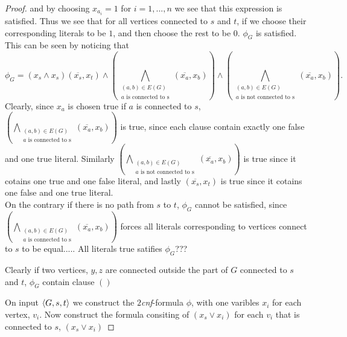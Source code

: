 \documentclass[a4paper,11pt]{article}
\numberwithin{equation}{section}
\begin{document}
\begin{proof}
		
		
		and by choosing $ x_{a_i}=1 $ for $ i=1,...,n $ we see that this expression is satisfied. Thus we see that for all vertices connected to $ s $ and $ t $, if we choose their corresponding literals to be $ 1 $, and then choose the rest to be $ 0 $. $ \phi_G $ is satisfied. This can be seen by noticing that \begin{equation*}
		\phi_G=(x_s\wedge x_s)(\overline{x_s},x_t)\wedge\left(\bigwedge_{\substack{(a,b)\in E(G)\\a \text{ is connected to s}}}(\overline{x_a},x_b)\right)\wedge\left(\bigwedge_{\substack{(a,b)\in E(G)\\a \text{ is not connected to s}}}(\overline{x_a},x_b)\right).
		\end{equation*}
		Clearly, since $ x_a $ is chosen true if $ a $ is connected to $ s $, $ \left(\bigwedge_{\substack{(a,b)\in E(G)\\a \text{ is connected to s}}}(\overline{x_a},x_b)\right) $ is true, since each clause contain exactly one false and one true literal. Similarly $ \left(\bigwedge_{\substack{(a,b)\in E(G)\\a \text{ is not connected to s}}}(\overline{x_a},x_b)\right) $ is true since it cotains one true and one false literal, and lastly $ (\overline{x_s},x_t) $ is true since it cotains one false and one true literal.\\
		On the contrary if there is no path from $ s $ to $ t $, $ \phi_G $ cannot be satisfied, since $ \left(\bigwedge_{\substack{(a,b)\in E(G)\\a \text{ is connected to s}}}(\overline{x_a},x_b)\right) $ forces all literals corresponding to vertices connect to $ s $ to be equal.....
		All literals true satifies $ \phi_G $???
		
		
		Clearly if two vertices, $ y,z $ are connected outside the part of $ G $ connected to $ s $ and $ t $, $ \phi_{G} $ contain clause $ () $
		
		On input $ \braket{G,s,t} $ we construct the $ 2 $\textit{cnf}-formula $ \phi $, with one varibles $ x_i $ for each vertex, $ v_i $. Now construct the formula consiting of $ (x_s\vee x_i) $ for each $ v_i $ that is connected to $ s $, $ (x_s\vee x_i) $
	\end{proof}
\end{document}
